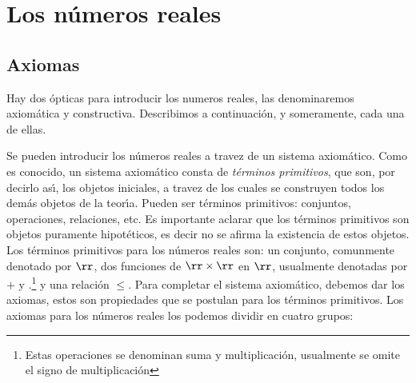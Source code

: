 \chapter{Los números reales}


\section{Axiomas}\label{sec,apendice}
 Hay dos ópticas para introducir los numeros
 reales, las denominaremos axiomática y constructiva.
 Describimos a continuación, y someramente, cada una de ellas.

 Se pueden introducir los números reales a travez de un sistema
 axiomático. Como es conocido, un sistema axiomático consta de
 \emph{términos primitivos}, que son, por decirlo as\'{\i}, los
 objetos iniciales, a travez de los cuales se construyen todos los
 demás objetos de la teor\'{\i}a. Pueden ser términos
 primitivos: conjuntos, operaciones, relaciones, etc. Es importante
 aclarar que los términos primitivos son objetos puramente
 hipotéticos, es decir no se afirma la existencia de estos
 objetos. Los términos primitivos para los números reales son:
 un conjunto, comunmente denotado por $\rr$, dos funciones de
  $\rr\times\rr$ en $\rr$, usualmente denotadas por $+$ y $.$\footnote
  {Estas operaciones se denominan suma y multiplicación,
  usualmente se omite el signo de multiplicación} y una relación
  $\leq$. Para completar el sistema axiomático,
  debemos dar los axiomas, estos son propiedades que se postulan
  para los términos primitivos. Los axiomas para los números
  reales los podemos dividir en cuatro grupos:

